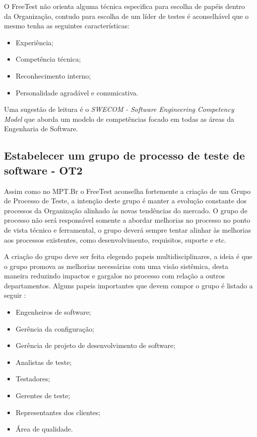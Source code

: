 O FreeTest não orienta alguma técnica especifica para escolha de papéis dentro da Organização, contudo para escolha de um líder de testes é aconselhável que o mesmo tenha as seguintes características:

\begin{itemize}
    \item Experiência;
    \item Competência técnica;
    \item Reconhecimento interno;
    \item Personalidade agradável e comunicativa.
\end{itemize}

Uma sugestão de leitura é o \textit{SWECOM - Software Engineering Competency Model} \cite{swecom2017} que aborda um modelo de competências focado em todas as áreas da Engenharia de Software.

\subsection{Estabelecer um grupo de processo de teste de software - OT2}

Assim como no MPT.Br \cite{GuiaMPTbr} o FreeTest aconselha fortemente a criação de um Grupo de Processo de Teste, a intenção deste grupo é manter a evolução constante dos processos da Organização alinhado às novas tendências do mercado. O grupo de processo não será responsável somente a abordar melhorias no processo no ponto de vista técnico e ferramental, o grupo deverá sempre tentar alinhar às melhorias aos processos existentes, como desenvolvimento, requisitos, suporte e etc.

A criação do grupo deve ser feita elegendo papeis multidisciplinares, a ideia é que o grupo promova as melhorias necessárias com uma visão sistêmica, desta maneira reduzindo impactos e gargalos no processo com relação a outros departamentos. Alguns papeis importantes que devem compor o grupo é listado a seguir \cite{GuiaMPTbr}:

\begin{itemize}
    \item Engenheiros de software;
    \item Gerência da configuração; 
    \item Gerência de projeto de desenvolvimento de software; 
    \item Analistas de teste; 
    \item Testadores; 
    \item Gerentes de teste; 
    \item Representantes dos clientes; 
    \item Área de qualidade.
\end{itemize}

